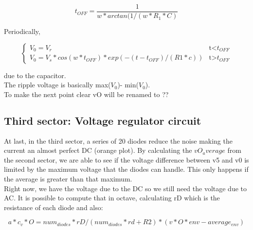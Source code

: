 \begin{equation} 
t_{OFF} = \frac{1}{w * arctan(1/(w*R_{1}*C)}
\label{eq2}
\end{equation}

Periodically, 

\begin{equation}
    \begin{cases}
      V_0=V_r & \text{t<$t_{OFF}$}\\
      V_0=V_s*cos(w*t_{OFF})*exp(-(t-t_{OFF})/(R1*c)) & \text{t>$t_{OFF}$}
    \end{cases}       
\end{equation}

due to the capacitor.\\
The ripple voltage is basically max($V_{0}$)- min($V_{0}$). \\
To make the next point clear vO will be renamed to ??

%



\subsection{Third sector: Voltage regulator circuit}

At last, in the third sector, a series of 20 diodes reduce the noise making the current an almost perfect DC (orange plot).
By calculating the $vO_average$ from the second sector, we are able to see if the voltage difference between v5 and v0 is limited by
the maximum voltage that the diodes can handle. This only happens if the average is greater than that maximum.\\
Right now, we have the voltage due to the DC so we still need the voltage due to AC. It is possible to compute that in octave, calculating rD which is the resistance of each diode and also:

\begin{equation}
 a*c_v*O = num_{diodes}*rD/(num_{diodes}*rd+R2)*(v*O*env-average_{env})
\label{eq3}
\end{equation}

